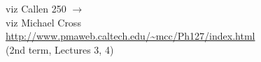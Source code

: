 \begin{center}
\begin{minipage}[b]{0.3\textwidth}
{\color{NavyBlue}
viz Callen 250 $\to$ \\
viz Michael Cross \\
{\small\url{http://www.pmaweb.caltech.edu/~mcc/Ph127/index.html}} \\
(2nd term, Lectures 3, 4)}
\vspace{2cm}
\end{minipage}
\end{center}

